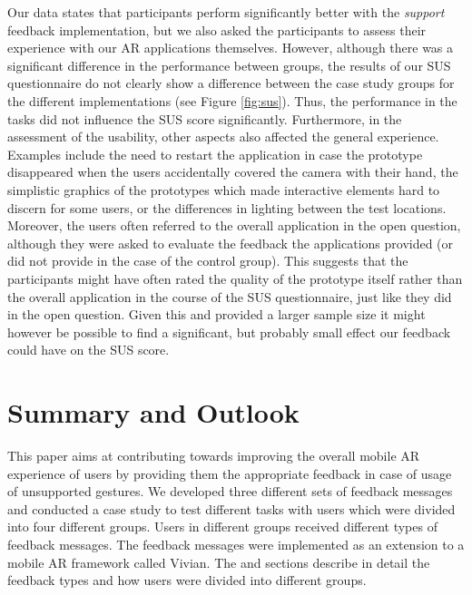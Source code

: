 \documentclass[11pt, a4paper]{article}
\begin{document}
			Our data states that participants perform significantly better with the \emph{support} feedback implementation, but we also asked the participants to assess their experience with our \ac{AR} applications themselves. However, although there was a significant difference in the performance between groups, the results of our \ac{SUS} questionnaire do not clearly show a difference between the case study groups for the different implementations (see Figure \ref{fig:sus}). Thus, the performance in the tasks did not influence the SUS score significantly. Furthermore, in the assessment of the usability, other aspects also affected the general experience. Examples include the need to restart the application in case the prototype disappeared when the users accidentally covered the camera with their hand, the simplistic graphics of the prototypes which made interactive elements hard to discern for some users, or the differences in lighting between the test locations. Moreover, the users often referred to the overall application in the open question, although they were asked to evaluate the feedback the applications provided (or did not provide in the case of the control group). This suggests that the participants might have often rated the quality of the prototype itself rather than the overall application in the course of the SUS questionnaire, just like they did in the open question. Given this and provided a larger sample size it might however be possible to find a significant, but probably small effect our feedback could have on the SUS score.


			


	\section*{Summary and Outlook}\label{sec:summary}
		This paper aims at contributing towards improving the overall mobile \ac{AR} experience of users by providing them the appropriate feedback in case of usage of unsupported gestures. We developed three different sets of feedback messages and conducted a case study to test different tasks with users which were divided into four different groups. Users in different groups received different types of feedback messages. The feedback messages were implemented as an extension to a mobile \ac{AR} framework called Vivian. The  and  sections describe in detail the feedback types and how users were divided into different groups.
		
\end{document}
